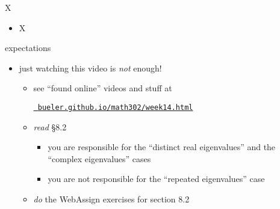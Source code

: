 \documentclass[urlcolor=blue,dvipsnames]{beamer}
\begin{document}
\begin{frame}{X}

\begin{itemize}
\item X
\end{itemize}
\end{frame}

\begin{frame}{expectations}

\begin{itemize}
\item just watching this video is \emph{not} enough!
     \begin{itemize}
     \item see ``found online'' videos and stuff at

     \centerline{\href{https://bueler.github.io/math302/week14.html}{\tt \color{cyan} bueler.github.io/math302/week14.html}}
     \item \emph{read} \S8.2
         \begin{itemize}
         \item you \alert{are responsible} for the ``distinct real eigenvalues'' and the ``complex eigenvalues'' cases
         \item you are not responsible for the ``repeated eigenvalues'' case
         \end{itemize}
     \item \emph{do} the WebAssign exercises for section 8.2
     \end{itemize}
\end{itemize}
\end{frame}
\end{document}
